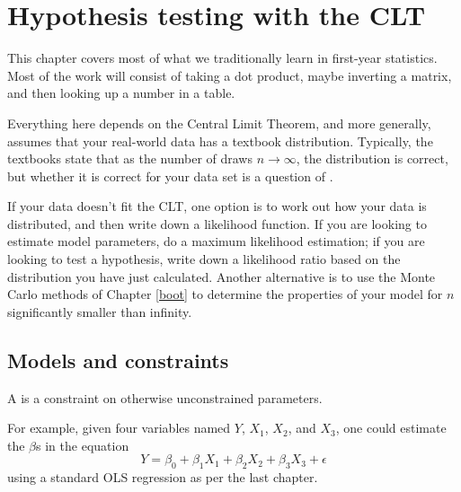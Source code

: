 \chapter[Gaussian tricks]{Hypothesis testing with the CLT} \label{gauss}

This chapter covers most of what we traditionally learn in first-year statistics. 
 Most of the work will consist of taking a dot product, maybe inverting a matrix,
and then looking up a number in a table. 

Everything here depends on the Central Limit Theorem, and more
generally, assumes that your real-world data has a textbook
distribution. Typically, the textbooks state that as the number of draws
$n \to \infty$, the distribution is correct, but whether it is correct
for your data set is a question of .

If your data doesn't fit the CLT, one option is to work out how your
data is distributed, 
and then write down a likelihood function. If you are
looking to estimate model parameters, do a maximum likelihood estimation;
if you are looking to test a hypothesis, write down a likelihood ratio
based on the distribution you have just calculated.
Another alternative is to use the Monte Carlo methods of 
Chapter \ref{boot} to determine the properties of your model for $n$ 
significantly smaller than infinity.


\section{Models and constraints} A  is a constraint
on otherwise unconstrained parameters. 

For example, given four variables named $Y$, $X_1$, $X_2$, and $X_3$,
one could estimate the $\beta$s in the equation
\begin{equation*}
Y = \beta_0 + \beta_1 X_1 + \beta_2 X_2 + \beta_3 X_3 + \epsilon
\end{equation*}
using a standard OLS regression as per the last chapter.

